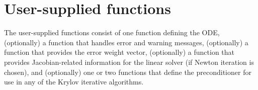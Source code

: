 \section{User-supplied functions}\label{ss:user_fct_sim}

The user-supplied functions consist of one function defining the ODE, 
(optionally) a function that handles error and warning messages, 
(optionally) a function that provides the error weight vector, 
(optionally) a function that provides Jacobian-related information for the linear 
solver (if Newton iteration is chosen), and (optionally) one or two functions 
that define the preconditioner for use in any of the Krylov iterative algorithms.

